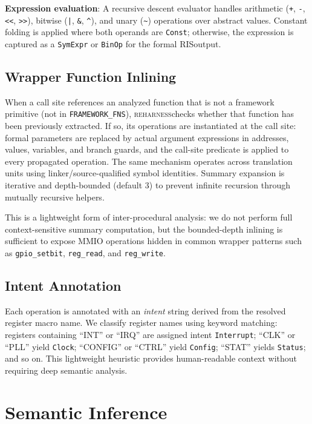 \documentclass[sigplan, screen, review, anonymous]{acmart}
\newcommand{\reharness}{\textsc{reharness}}
\newcommand{\rislang}{RIS}
\begin{document}
\textbf{Expression evaluation}: A recursive descent evaluator handles arithmetic (\texttt{+}, \texttt{-}, \texttt{<<}, \texttt{>>}), bitwise (\texttt{|}, \texttt{\&}, \texttt{\^{}}), and unary (\texttt{\~{}}) operations over abstract values. Constant folding is applied where both operands are \texttt{Const}; otherwise, the expression is captured as a \texttt{SymExpr} or \texttt{BinOp} for the formal \rislang output.

\subsection{Wrapper Function Inlining}

When a call site references an analyzed function that is not a framework primitive (not in \texttt{FRAMEWORK\_FNS}), \reharness checks whether that function has been previously extracted. If so, its operations are instantiated at the call site: formal parameters are replaced by actual argument expressions in addresses, values, variables, and branch guards, and the call-site predicate is applied to every propagated operation. The same mechanism operates across translation units using linker/source-qualified symbol identities. Summary expansion is iterative and depth-bounded (default 3) to prevent infinite recursion through mutually recursive helpers.

This is a lightweight form of inter-procedural analysis: we do not perform full context-sensitive summary computation, but the bounded-depth inlining is sufficient to expose MMIO operations hidden in common wrapper patterns such as \texttt{gpio\_setbit}, \texttt{reg\_read}, and \texttt{reg\_write}.

\subsection{Intent Annotation}

Each operation is annotated with an \emph{intent} string derived from the resolved register macro name. We classify register names using keyword matching: registers containing ``INT'' or ``IRQ'' are assigned intent \texttt{Interrupt}; ``CLK'' or ``PLL'' yield \texttt{Clock}; ``CONFIG'' or ``CTRL'' yield \texttt{Config}; ``STAT'' yields \texttt{Status}; and so on. This lightweight heuristic provides human-readable context without requiring deep semantic analysis.

\section{Semantic Inference}
\end{document}
